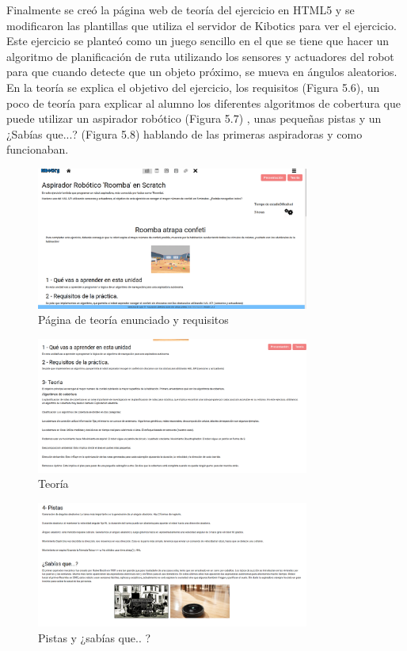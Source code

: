 Finalmente se creó la página web de teoría del ejercicio en HTML5 y se modificaron las plantillas que utiliza el servidor de Kibotics para ver el ejercicio. Este ejercicio se planteó como un juego sencillo en el que se tiene que hacer un algoritmo de planificación de ruta utilizando los sensores y actuadores del robot  para que cuando detecte que un objeto próximo, se mueva en ángulos aleatorios. 
En la teoría se explica el objetivo del ejercicio, los requisitos (Figura 5.6), un poco de teoría para explicar al alumno los diferentes algoritmos de cobertura que puede utilizar un aspirador robótico (Figura  5.7) , unas pequeñas pistas y un ¿Sabías que...? (Figura 5.8) hablando de las primeras aspiradoras y como funcionaban. 


\begin{figure}[H]
    \centering
    \includegraphics[width=0.8\textwidth, height=0.4\textwidth]{chapters/images/teoria1.png}
    \caption{Página de teoría enunciado y requisitos}
    \label{fig:my_label}
\end{figure}
\begin{figure}[H]
    \centering
    \includegraphics[width=0.8\textwidth, height=0.4\textwidth]{chapters/images/teoria2.png}
    \caption{Teoría}
    \label{fig:my_label}
\end{figure}
\begin{figure}[H]
    \centering
    \includegraphics[width=0.8\textwidth, height=0.4\textwidth]{chapters/images/teoria3.png}
    \caption{Pistas y ¿sabías que.. ?}
    \label{fig:my_label}
\end{figure}


